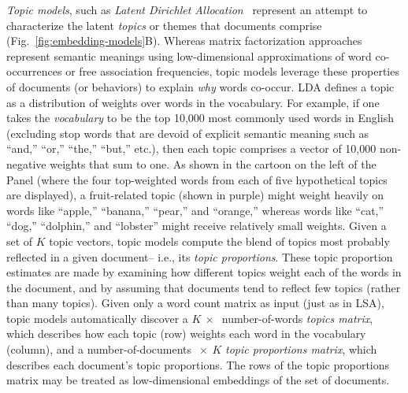 \documentclass{article}
\begin{document}
\textit{Topic models}, such as \textit{Latent Dirichlet Allocation}~\citep[LDA;][]{BleiEtal03} represent an attempt to characterize the latent \textit{topics} or themes that documents comprise (Fig.~\ref{fig:embedding-models}B).  Whereas matrix factorization approaches represent semantic meanings using low-dimensional approximations of word co-occurrences or free association frequencies, topic models leverage these properties of documents (or behaviors) to explain \textit{why} words co-occur.  LDA defines a topic as a distribution of weights over words in the vocabulary.  For example, if one takes the \textit{vocabulary} to be the top 10,000 most commonly used words in English (excluding stop words that are devoid of explicit semantic meaning such as ``and,'' ``or,'' ``the,'' ``but,'' etc.), then each topic comprises a vector of 10,000 non-negative weights that sum to one.  As shown in the cartoon on the left of the Panel (where the four top-weighted words from each of five hypothetical topics are displayed), a fruit-related topic (shown in purple) might weight heavily on words like ``apple,'' ``banana,'' ``pear,'' and ``orange,'' whereas words like ``cat,'' ``dog,'' ``dolphin,'' and ``lobster'' might receive relatively small weights.  Given a set of $K$ topic vectors, topic models compute the blend of topics most probably reflected in a given document-- i.e., its \textit{topic proportions}.  These topic proportion estimates are made by examining how different topics weight each of the words in the document, and by assuming that documents tend to reflect few topics (rather than many topics).  Given only a word count matrix as input (just as in LSA), topic models automatically discover a $K~\times~$ number-of-words \textit{topics matrix}, which describes how each topic (row) weights each word in the vocabulary (column), and a number-of-documents $~\times~K$ \textit{topic proportions matrix}, which describes each document's topic proportions.  The rows of the topic proportions matrix may be treated as low-dimensional embeddings of the set of documents.
\end{document}
